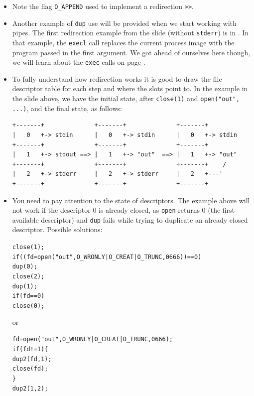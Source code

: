 \begin{itemize}
\item Note the flag \texttt{O\_APPEND} used to implement a redirection
\texttt{>>}.
\item \label{REDIRECT} Another example of \texttt{dup} use will be provided when
we start working with pipes.  The first redirection example from the slide
(without \texttt{stderr}) is in .  In that example, the
\texttt{execl} call replaces the current process image with the
program passed in the first argument.  We got ahead of ourselves here though, we
will learn about the \texttt{exec} calls on page \pageref{EXEC}.
\item To fully understand how redirection works it is good to draw the file
descriptor table for each step and where the slots point to.  In 
the  example in the slide above, we have the initial state, after
\texttt{close(1)} and \texttt{open("out", ...)}, and the final state, as
follows:

\begin{verbatim}
+-------+              +-------+              +-------+
|   0   +-> stdin      |   0   +-> stdin      |   0   +-> stdin
+-------+              +-------+              +-------+
|   1   +-> stdout ==> |   1   +-> "out"  ==> |   1   +-> "out"
+-------+              +-------+              +-------+    /
|   2   +-> stderr     |   2   +-> stderr     |   2   +---' 
+-------+              +-------+              +-------+
\end{verbatim}

\item You need to pay attention to the state of descriptors. The  example
above will not work if the descriptor 0 is already closed, as 
\texttt{open} returns 0 (the first available descriptor) and \texttt{dup} fails
while trying to duplicate an already closed descriptor.  Possible
solutions:

\begin{alltt}
close(1);
if((fd = open("out", O\_WRONLY | O\_CREAT | O\_TRUNC, 0666)) == 0)
        dup(0);
close(2);
dup(1);
if(fd == 0)
        close(0);
\end{alltt}

or

\begin{alltt}
fd = open("out", O\_WRONLY | O\_CREAT | O\_TRUNC, 0666);
if(fd != 1) \{
        dup2(fd, 1);
        close(fd);
\}
dup2(1, 2);
\end{alltt}
\end{itemize}

